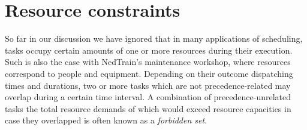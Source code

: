 	
\section{Resource constraints}
\label{chapter:prelim-1:resource-constraints}

	So far in our discussion we have ignored that in many applications of scheduling,
	tasks occupy certain amounts of one or more resources during their execution.
	Such is also the case with NedTrain's maintenance workshop,
	where resources correspond to people and equipment.
	Depending on their outcome dispatching times and durations,
	two or more tasks which are not precedence-related may overlap during a certain time interval.
	A combination of precedence-unrelated tasks the total resource demands of 
	which would exceed resource capacities in case they overlapped is often known as a \emph{forbidden set}.

